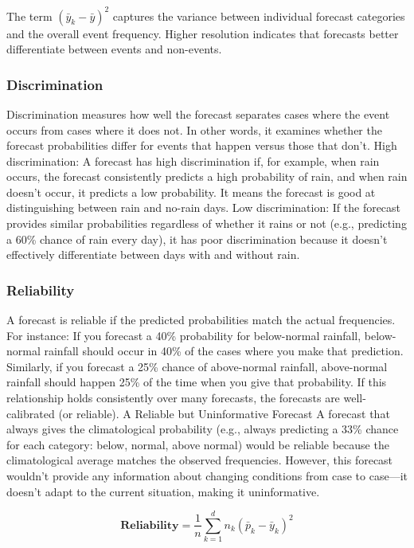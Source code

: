 \documentclass[11pt]{article}
\begin{document}
The term $\left( \bar{y}_k - \bar{y} \right)^2$ captures the variance between individual forecast categories and the overall event frequency. Higher resolution indicates that forecasts better differentiate between events and non-events.



		\subsubsection{Discrimination}

Discrimination measures how well the forecast separates cases where the event occurs from cases where it does not. In other words, it examines whether the forecast probabilities differ for events that happen versus those that don't.
High discrimination: A forecast has high discrimination if, for example, when rain occurs, the forecast consistently predicts a high probability of rain, and when rain doesn’t occur, it predicts a low probability. It means the forecast is good at distinguishing between rain and no-rain days.
Low discrimination: If the forecast provides similar probabilities regardless of whether it rains or not (e.g., predicting a 60\% chance of rain every day), it has poor discrimination because it doesn’t effectively differentiate between days with and without rain.
		\subsubsection{Reliability}

A forecast is reliable if the predicted probabilities match the actual frequencies. For instance:
If you forecast a 40\% probability for below-normal rainfall, below-normal rainfall should occur in 40\% of the cases where you make that prediction.
Similarly, if you forecast a 25\% chance of above-normal rainfall, above-normal rainfall should happen 25\% of the time when you give that probability.
If this relationship holds consistently over many forecasts, the forecasts are well-calibrated (or reliable).
A Reliable but Uninformative Forecast
A forecast that always gives the climatological probability (e.g., always predicting a 33\% chance for each category: below, normal, above normal) would be reliable because the climatological average matches the observed frequencies. However, this forecast wouldn’t provide any information about changing conditions from case to case—it doesn’t adapt to the current situation, making it uninformative.

\begin{equation}
\textbf{Reliability} = \frac{1}{n} \sum_{k=1}^{d} n_k \left( \bar{p}_k - \bar{y}_k \right)^2
\end{equation}
\end{document}
